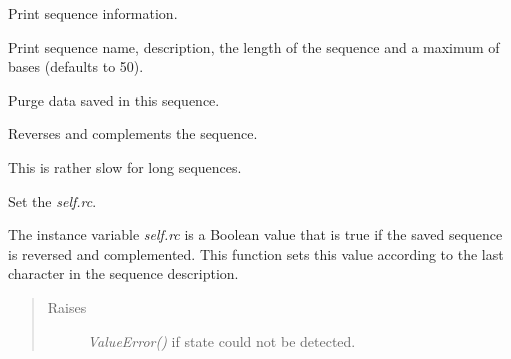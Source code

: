 \documentclass[letterpaper,10pt,english]{sphinxmanual}
\begin{document}
\begin{fulllineitems}
\begin{fulllineitems}
\begin{quote}
\begin{description}
\end{description}\end{quote}

\end{fulllineitems}


\begin{fulllineitems}
\label{seqbase:libPoMo.seqbase.Seq.print_info}
Print sequence information.

Print sequence name, description, the length of the sequence
and a maximum of  bases (defaults to 50).

\end{fulllineitems}


\begin{fulllineitems}
\label{seqbase:libPoMo.seqbase.Seq.purge}
Purge data saved in this sequence.

\end{fulllineitems}


\begin{fulllineitems}
\label{seqbase:libPoMo.seqbase.Seq.rev_comp}
Reverses and complements the sequence.

This is rather slow for long sequences.

\end{fulllineitems}


\begin{fulllineitems}
\label{seqbase:libPoMo.seqbase.Seq.set_rc}
Set the \emph{self.rc}.

The instance variable \emph{self.rc} is a Boolean value that is
true if the saved sequence is reversed and complemented.  This
function sets this value according to the last character in
the sequence description.
\begin{quote}\begin{description}
\item[{Raises}] \leavevmode
\emph{ValueError()} if state could not be detected.


\end{description}
\end{quote}
\end{fulllineitems}
\end{fulllineitems}
\end{document}
